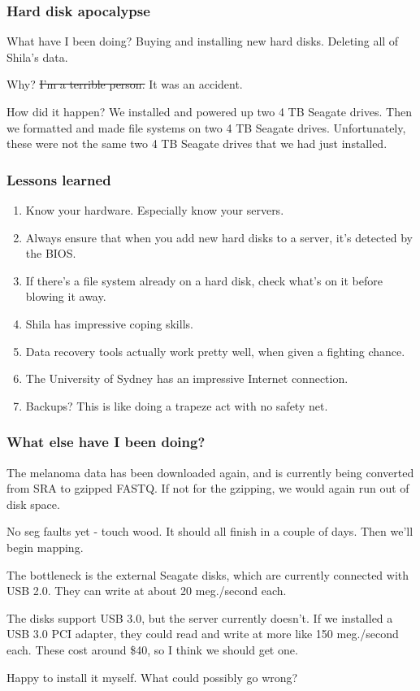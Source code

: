 \documentclass{beamer}
\begin{document}
\begin{frame}
\frametitle{Hard disk apocalypse}
What have I been doing? Buying and installing new hard disks. Deleting all of Shila's data.

Why? \st{I'm a terrible person. }It was an accident.

How did it happen? We installed and powered up two 4 TB Seagate drives. Then we formatted and made file systems on two 4 TB Seagate drives. Unfortunately, these were not the same two 4 TB Seagate drives that we had just installed.
\end{frame}

\begin{frame}
\frametitle{Lessons learned}
\begin{enumerate}
\item Know your hardware. Especially know your servers.
\item Always ensure that when you add new hard disks to a server, it's detected by the BIOS.
\item If there's a file system already on a hard disk, check what's on it before blowing it away.
\item Shila has impressive coping skills.
\item Data recovery tools actually work pretty well, when given a fighting chance.
\item The University of Sydney has an impressive Internet connection.
\item Backups? This is like doing a trapeze act with no safety net.
\end{enumerate}
\end{frame}

\begin{frame}
\frametitle{What else have I been doing?}
The melanoma data has been downloaded again, and is currently being converted from SRA to
gzipped FASTQ. If not for the gzipping, we would again run out of disk space.

No seg faults yet - touch wood. It should all finish in a couple of days. Then we'll begin 
mapping.

The bottleneck is the external Seagate disks, which are currently connected with USB 2.0. 
They can write at about 20 meg./second each.

The disks support USB 3.0, but the server currently doesn't. If we installed a USB 3.0 PCI 
adapter, they could read and write at more like 150 meg./second each. These cost around 
\$40, so I think we should get one.

Happy to install it myself. What could possibly go wrong?
\end{frame}
\end{document}
